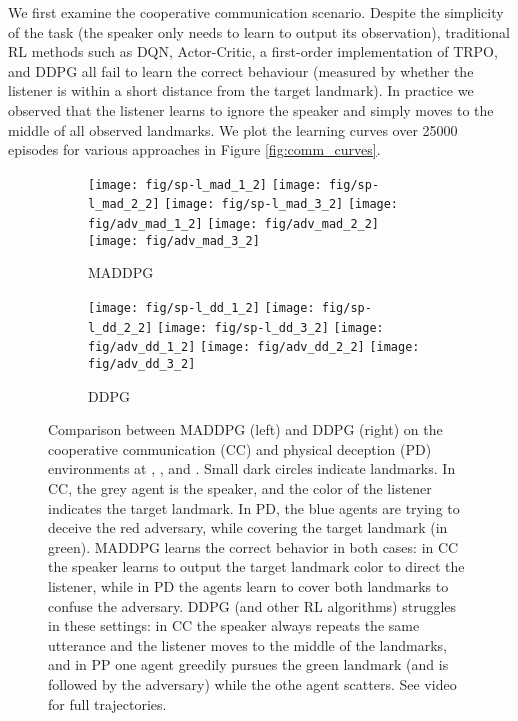 \documentclass{article}
\begin{document}
We first examine the cooperative communication scenario. Despite the simplicity of the task (the speaker only needs to learn to output its observation), traditional RL methods such as DQN, Actor-Critic, a first-order implementation of TRPO, and DDPG all fail to learn the correct behaviour (measured by whether the listener is within a short distance from the target landmark). In practice we observed that the listener learns to ignore the speaker and simply moves to the middle of all observed landmarks. We plot the learning curves over 25000 episodes for various approaches in Figure \ref{fig:comm_curves}.



\begin{figure}
\begin{subfigure}{.50\textwidth}
  \centering
  \texttt{[image: fig/sp-l\_mad\_1\_2]}
  \texttt{[image: fig/sp-l\_mad\_2\_2]}
  \texttt{[image: fig/sp-l\_mad\_3\_2]}
  \texttt{[image: fig/adv\_mad\_1\_2]}
  \texttt{[image: fig/adv\_mad\_2\_2]}
  \texttt{[image: fig/adv\_mad\_3\_2]}
  \caption{MADDPG}
\end{subfigure}
\hspace{1mm}
\begin{subfigure}{.50\textwidth}
  \centering
  \texttt{[image: fig/sp-l\_dd\_1\_2]}
  \texttt{[image: fig/sp-l\_dd\_2\_2]}
  \texttt{[image: fig/sp-l\_dd\_3\_2]}
  \texttt{[image: fig/adv\_dd\_1\_2]}
  \texttt{[image: fig/adv\_dd\_2\_2]}
  \texttt{[image: fig/adv\_dd\_3\_2]}
  \caption{DDPG}
\end{subfigure}
\vspace{-2mm}
\caption{Comparison between MADDPG (left) and DDPG (right) on the cooperative communication (CC) and physical deception (PD) environments at , , and . Small dark circles indicate landmarks. In CC, the grey agent is the speaker, and the color of the listener indicates the target landmark. In PD, the blue agents are trying to deceive the red adversary, while covering the target landmark (in green). MADDPG learns the correct behavior in both cases: in CC the speaker learns to output the target landmark color to direct the listener, while in PD the agents learn to cover both landmarks to confuse the adversary. DDPG (and other RL algorithms) struggles in these settings: in CC the speaker always repeats the same utterance and the listener moves to the middle of the landmarks, and in PP one agent greedily pursues the green landmark (and is followed by the adversary) while the othe agent scatters. See video for full trajectories. \vspace{-4mm}}\label{fig:disp}
\end{figure}
\end{document}
